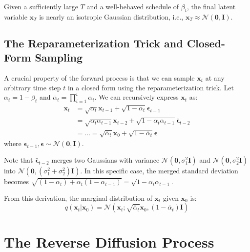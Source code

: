 Given a sufficiently large $T$ and a well-behaved schedule of $\beta_t$, the final latent variable $\mathbf{x}_T$ is nearly an isotropic Gaussian distribution, i.e., $\mathbf{x}_T \approx \mathcal{N}(\mathbf{0}, \mathbf{I})$.

\subsection{The Reparameterization Trick and Closed-Form Sampling}

A crucial property of the forward process is that we can sample $\mathbf{x}_t$ at any arbitrary time step $t$ in a closed form using the reparameterization trick. Let $\alpha_t = 1 - \beta_t$ and $\bar{\alpha}_t = \prod_{i=1}^t \alpha_i$. We can recursively express $\mathbf{x}_t$ as:
\begin{align}
    \mathbf{x}_t &= \sqrt{\alpha_t} \mathbf{x}_{t-1} + \sqrt{1 - \alpha_t}\boldsymbol{\epsilon}_{t-1} \\
                 &= \sqrt{\alpha_t \alpha_{t-1}} \mathbf{x}_{t-2} + \sqrt{1 - \alpha_t \alpha_{t-1}} \bar{\boldsymbol{\epsilon}}_{t-2} \\
                 &= \dots = \sqrt{\bar{\alpha}_t} \mathbf{x}_0 + \sqrt{1 - \bar{\alpha}_t} \boldsymbol{\epsilon}
\end{align}
where $\boldsymbol{\epsilon}_{t-1}, \boldsymbol{\epsilon} \sim \mathcal{N}(\mathbf{0}, \mathbf{I})$. 

\begin{insightbox}
Note that $\bar{\boldsymbol{\epsilon}}_{t-2}$ merges two Gaussians with variance $\mathcal{N}(\mathbf{0}, \sigma_1^2 \mathbf{I})$ and $\mathcal{N}(\mathbf{0}, \sigma_2^2 \mathbf{I})$ into $\mathcal{N}(\mathbf{0}, (\sigma_1^2 + \sigma_2^2)\mathbf{I})$. In this specific case, the merged standard deviation becomes $\sqrt{(1-\alpha_t) + \alpha_t(1-\alpha_{t-1})} = \sqrt{1 - \alpha_t \alpha_{t-1}}$.
\end{insightbox}

From this derivation, the marginal distribution of $\mathbf{x}_t$ given $\mathbf{x}_0$ is:
\begin{equation}
    q(\mathbf{x}_t | \mathbf{x}_0) = \mathcal{N}(\mathbf{x}_t; \sqrt{\bar{\alpha}_t}\mathbf{x}_0, (1 - \bar{\alpha}_t)\mathbf{I})
\end{equation}

\section{The Reverse Diffusion Process}

